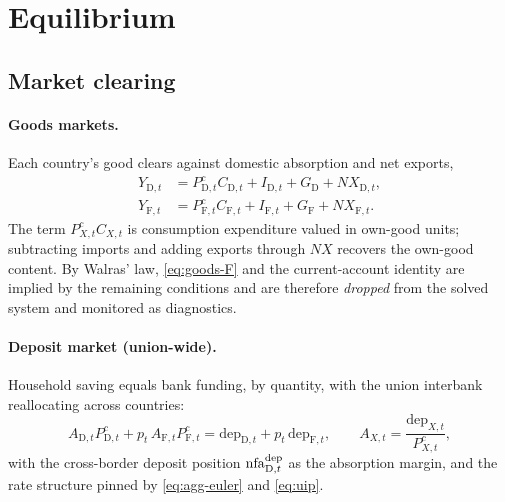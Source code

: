 \documentclass[11pt]{article}
\numberwithin{equation}{section}
\newcommand{\D}{\mathrm{D}}
\newcommand{\F}{\mathrm{F}}
\theoremstyle{definition}
\theoremstyle{plain}
\theoremstyle{remark}
\begin{document}
\section{Equilibrium}
\label{sec:equilibrium}

\subsection{Market clearing}

\paragraph{Goods markets.} Each country's good clears against domestic absorption
and net exports,
\begin{align}
Y_{\D,t}&=P^{c}_{\D,t}C_{\D,t}+I_{\D,t}+G_\D+NX_{\D,t},
\label{eq:goods-D}\\
Y_{\F,t}&=P^{c}_{\F,t}C_{\F,t}+I_{\F,t}+G_\F+NX_{\F,t}.
\label{eq:goods-F}
\end{align}
The term $P^{c}_{X,t}C_{X,t}$ is consumption expenditure valued in own-good units;
subtracting imports and adding exports through $NX$ recovers the own-good content.
By Walras' law, \eqref{eq:goods-F} and the current-account identity are implied by
the remaining conditions and are therefore \emph{dropped} from the solved system and
monitored as diagnostics.

\paragraph{Deposit market (union-wide).} Household saving equals bank funding, by
quantity, with the union interbank reallocating across countries:
\begin{equation}
A_{\D,t}P^{c}_{\D,t}+p_t\,A_{\F,t}P^{c}_{\F,t}
=\mathrm{dep}_{\D,t}+p_t\,\mathrm{dep}_{\F,t},
\qquad
A_{X,t}=\frac{\mathrm{dep}_{X,t}}{P^{c}_{X,t}} ,
\label{eq:deposit-clearing}
\end{equation}
with the cross-border deposit position $\mathrm{nfa}^{\rm dep}_{\D,t}$ as the
absorption margin, and the rate structure pinned by \eqref{eq:agg-euler} and
\eqref{eq:uip}.
\end{document}
